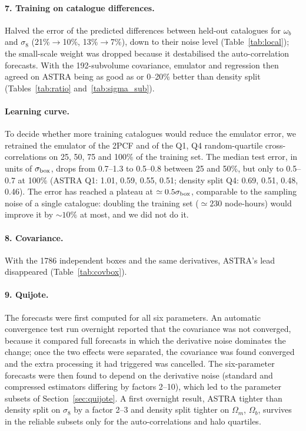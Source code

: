 \documentclass[11pt,twocolumn]{article}
\begin{document}
\paragraph{7. Training on catalogue differences.} Halved the error of the predicted differences between held-out catalogues for $\omega_b$ and $\sigma_8$ (21\%$\to$10\%, 13\%$\to$7\%), down to their noise level (Table~\ref{tab:local}); the small-scale weight was dropped because it destabilised the auto-correlation forecasts. With the 192-subvolume covariance, emulator and regression then agreed on ASTRA being as good as or 0--20\% better than density split (Tables~\ref{tab:ratio} and~\ref{tab:sigma_sub}).

\paragraph{Learning curve.} To decide whether more training catalogues would reduce the emulator error, we retrained the emulator of the 2PCF and of the Q1, Q4 random-quartile cross-correlations on 25, 50, 75 and 100\% of the training set. The median test error, in units of $\sigma_{\rm box}$, drops from 0.7--1.3 to 0.5--0.8 between 25 and 50\%, but only to 0.5--0.7 at 100\% (ASTRA Q1: 1.01, 0.59, 0.55, 0.51; density split Q4: 0.69, 0.51, 0.48, 0.46). The error has reached a plateau at $\simeq0.5\sigma_{\rm box}$, comparable to the sampling noise of a single catalogue: doubling the training set ($\simeq230$ node-hours) would improve it by $\sim10\%$ at most, and we did not do it.

\paragraph{8. Covariance.} With the 1786 independent boxes and the same derivatives, ASTRA's lead disappeared (Table~\ref{tab:covbox}).

\paragraph{9. Quijote.} The forecasts were first computed for all six parameters. An automatic convergence test run overnight reported that the covariance was not converged, because it compared full forecasts in which the derivative noise dominates the change; once the two effects were separated, the covariance was found converged and the extra processing it had triggered was cancelled. The six-parameter forecasts were then found to depend on the derivative noise (standard and compressed estimators differing by factors 2--10), which led to the parameter subsets of Section~\ref{sec:quijote}. A first overnight result, ASTRA tighter than density split on $\sigma_8$ by a factor 2--3 and density split tighter on $\Omega_m$, $\Omega_b$, survives in the reliable subsets only for the auto-correlations and halo quartiles.
\end{document}
